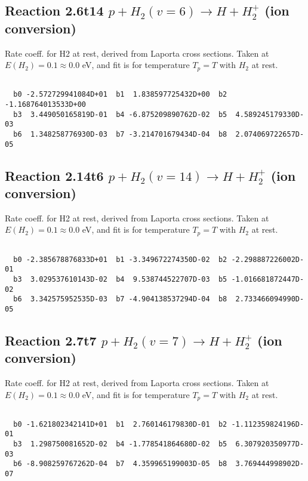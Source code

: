 \documentclass[12pt,dvipdfmx]{article}
\begin{document}
\newpage
\subsection{
Reaction 2.6t14
$ p + H_2(v=6) \rightarrow H + H_2^+$ (ion conversion)
}
Rate coeff. for H2 at rest, derived from Laporta cross sections.
Taken at $E(H_2) = 0.1 \approx 0.0$ eV,  and fit is for temperature $T_p=T$ with $H_2$ at rest.

\begin{small}\begin{verbatim}

  b0 -2.572729941084D+01  b1  1.838597725432D+00  b2 -1.168764013533D+00
  b3  3.449050165819D-01  b4 -6.875209890762D-02  b5  4.589245179330D-03
  b6  1.348258776930D-03  b7 -3.214701679434D-04  b8  2.074069722657D-05

\end{verbatim}\end{small}

\newpage
\subsection{
Reaction 2.14t6
$ p + H_2(v=14) \rightarrow H + H_2^+$ (ion conversion)
}
Rate coeff. for H2 at rest, derived from Laporta cross sections.
Taken at $E(H_2) = 0.1 \approx 0.0$ eV,  and fit is for temperature $T_p=T$ with $H_2$ at rest.

\begin{small}\begin{verbatim}

  b0 -2.385678876833D+01  b1 -3.349672274350D-02  b2 -2.298887226002D-01
  b3  3.029537610143D-02  b4  9.538744522707D-03  b5 -1.016681872447D-02
  b6  3.342575952535D-03  b7 -4.904138537294D-04  b8  2.733466094990D-05

\end{verbatim}\end{small}

\newpage
\subsection{
Reaction 2.7t7
$ p + H_2(v=7) \rightarrow H + H_2^+$ (ion conversion)
}
Rate coeff. for H2 at rest, derived from Laporta cross sections.
Taken at $E(H_2) = 0.1 \approx 0.0$ eV,  and fit is for temperature $T_p=T$ with $H_2$ at rest.

\begin{small}\begin{verbatim}

  b0 -1.621802342141D+01  b1  2.760146179830D-01  b2 -1.112359824196D-01
  b3  1.298750081652D-02  b4 -1.778541864680D-02  b5  6.307920350977D-03
  b6 -8.908259767262D-04  b7  4.359965199003D-05  b8  3.769444998902D-07

\end{verbatim}\end{small}
\end{document}
